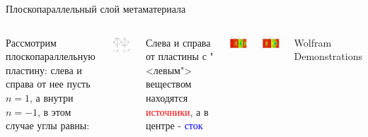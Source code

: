 \documentclass[9pt, compress, xcolor=table]{beamer}
\begin{document}
\begin{frame}{Плоскопараллельный слой метаматериала}

\begin{columns}[c]
\column{6cm} Рассмотрим плоскопараллельную пластину: слева и справа от нее пусть $n=1$, а внутри
$n=-1$, в этом случае углы равны:
\begin{center}
\includegraphics[width=4cm]{neg_ref_3}
\end{center}

Слева и справа от пластины с "<левым"> веществом находятся \textcolor{red}{источники}, а в центре -
\textcolor{blue}{сток}



\column{6cm}

\begin{center}
\includegraphics[width=3.8cm]{neg_ref_4}
\end{center}
\begin{center}
\includegraphics[width=3.8cm]{neg_ref_5}
\end{center}
Wolfram Demonstrations
\end{columns}

\end{frame}
\end{document}
